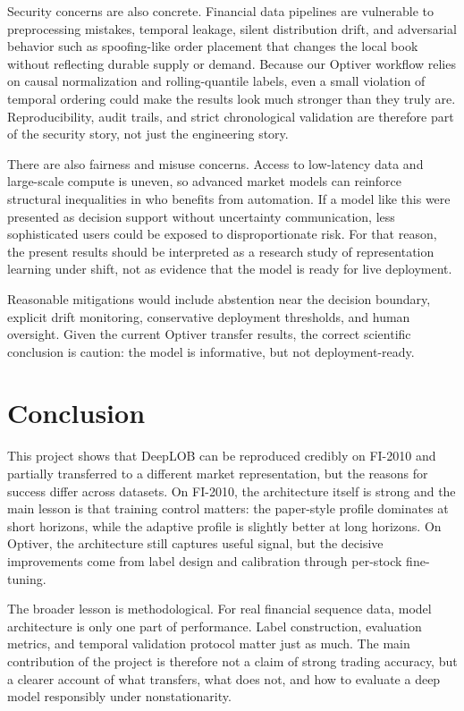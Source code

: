 \documentclass[11pt]{article}
\begin{document}
Security concerns are also concrete. Financial data pipelines are vulnerable to preprocessing mistakes, temporal leakage, silent distribution drift, and adversarial behavior such as spoofing-like order placement that changes the local book without reflecting durable supply or demand. Because our Optiver workflow relies on causal normalization and rolling-quantile labels, even a small violation of temporal ordering could make the results look much stronger than they truly are. Reproducibility, audit trails, and strict chronological validation are therefore part of the security story, not just the engineering story.

There are also fairness and misuse concerns. Access to low-latency data and large-scale compute is uneven, so advanced market models can reinforce structural inequalities in who benefits from automation. If a model like this were presented as decision support without uncertainty communication, less sophisticated users could be exposed to disproportionate risk. For that reason, the present results should be interpreted as a research study of representation learning under shift, not as evidence that the model is ready for live deployment.

Reasonable mitigations would include abstention near the decision boundary, explicit drift monitoring, conservative deployment thresholds, and human oversight. Given the current Optiver transfer results, the correct scientific conclusion is caution: the model is informative, but not deployment-ready.

\section{Conclusion}
This project shows that DeepLOB can be reproduced credibly on FI-2010 and partially transferred to a different market representation, but the reasons for success differ across datasets. On FI-2010, the architecture itself is strong and the main lesson is that training control matters: the paper-style profile dominates at short horizons, while the adaptive profile is slightly better at long horizons. On Optiver, the architecture still captures useful signal, but the decisive improvements come from label design and calibration through per-stock fine-tuning.

The broader lesson is methodological. For real financial sequence data, model architecture is only one part of performance. Label construction, evaluation metrics, and temporal validation protocol matter just as much. The main contribution of the project is therefore not a claim of strong trading accuracy, but a clearer account of what transfers, what does not, and how to evaluate a deep model responsibly under nonstationarity.
\end{document}

